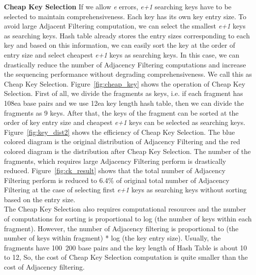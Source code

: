 
\textbf{Cheap Key Selection} If we allow \textit{e} errors, \textit{e+1}
searching keys have to be selected to maintain comprehensiveness. Each key has
its own key entry size. To avoid large Adjacent Filtering computation, we can
select the smallest \textit{e+1} keys as searching keys. Hash table already
stores the entry sizes corresponding to each key and based on this information,
we can easily sort the key at the order of entry size and select cheapest
\textit{e+1} keys as searching keys. In this case, we can drastically reduce
the number of Adjacency Filtering computations and increase the sequencing
performance without degrading comprehensiveness. We call this as Cheap Key
Selection. Figure~\ref{fig:cheap_key} shows the operation of Cheap Key
Selection.  First of all, we divide the fragments as keys, i.e. if each
fragment has 108ea base pairs and we use 12ea key length hash table, then we
can divide the fragments as 9 keys. After that, the keys of the fragment can be
sorted at the order of key entry size and cheapest \textit{e+1} keys can be
selected as searching keys. Figure~\ref{fig:key_dist2} shows the efficiency of
Cheap Key Selection. The blue colored diagram is the original distribution of
Adjacency Filtering and the red colored diagram is the distribution after Cheap
Key Selection. The number of the fragments, which requires large Adjacency
Filtering perform is drastically reduced.  Figure~\ref{fig:ck_result} shows
that the total number of Adjacency Filtering perform is reduced to 6.4\% of
original total number of Adjacency Filtering at the case of selecting first
\textit{e+1} keys as searching keys without sorting based on the entry size. \\
The Cheap Key Selection also requires computational resources and the number of
computations for sorting is proportional to log (the number of keys within each
fragment).  However, the number of Adjacency filtering is proportional to (the
number of keys within fragment) * log (the key entry size).  Usually, the
fragments have 100~200 base pairs and the key length of Hash Table is about 10
to 12, So, the cost of Cheap Key Selection computation is quite smaller than
the cost of Adjacency filtering. \\

